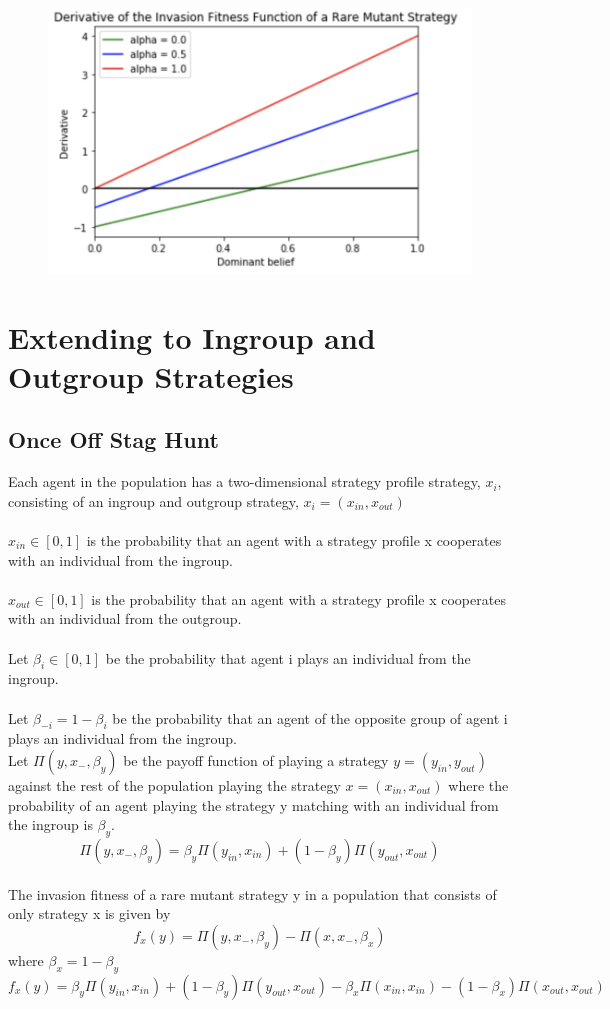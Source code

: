 \documentclass[]{llncs}
\begin{document}
\begin{figure}
\centering
\includegraphics[width=12cm]{images/invasion_fitness_alpha}
\end{figure}


\section{Extending to Ingroup and Outgroup Strategies}

\subsection{Once Off Stag Hunt}

Each agent in the population has a two-dimensional strategy profile strategy, $x_i$, consisting of an ingroup and outgroup strategy,  $x_i = (x_{in}, x_{out})$\\
\\
$x_{in} \in [0,1]$ is the probability that an agent with a strategy profile x cooperates with an individual from the ingroup. \\
\\
$x_{out} \in [0,1]$ is the probability that an agent with a strategy profile x cooperates with an individual from the outgroup. \\
\\
Let $\beta_i \in [0,1]$ be the probability that agent i plays an individual from the ingroup.\\
\\
Let $\beta_{-i} = 1 -\beta_i $ be the probability that an agent of the opposite group of agent i plays an individual from the ingroup.\\

Let $ \Pi ( y, x_{-}, \beta_y)$ be the payoff function of playing a strategy $y = (y_{in}, y_{out}) $ against the rest of the population playing the strategy $x = (x_{in}, x_{out})$ where the probability of an agent playing the strategy y matching with an individual from the ingroup is $\beta_y$.
\[
\Pi ( y, x_{-} , \beta_y) = \beta_y \Pi ( y_{in}, x_{in}) + (1-\beta_y) \Pi ( y_{out}, x_{out} ) 
\]
\\
The invasion fitness of a rare mutant strategy y in a population that consists of only strategy x is given by 
\[
f_x(y) = \Pi ( y, x_{-} , \beta_y) - \Pi ( x, x_{-} , \beta_x) 
\]
where $\beta_x = 1 - \beta_y$
\[
f_x(y) = \beta_y \Pi ( y_{in}, x_{in}) + (1-\beta_y) \Pi ( y_{out}, x_{out} )  - \beta_x \Pi ( x_{in}, x_{in}) - (1-\beta_x) \Pi ( x_{out}, x_{out} ) 
\]
\end{document}
